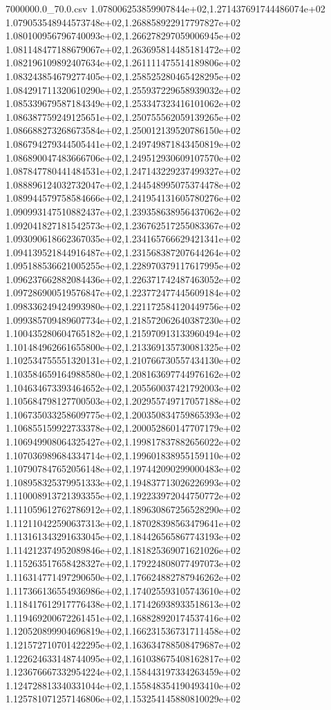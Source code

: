 \begin{filecontents*}{7000000.0_70.0.csv}
1.078006253859907844e+02,1.271437691744486074e+02
1.079053548944573748e+02,1.268858922917797827e+02
1.080100956796740093e+02,1.266278297059006945e+02
1.081148477188679067e+02,1.263695814485181472e+02
1.082196109892407634e+02,1.261111475514189806e+02
1.083243854679277405e+02,1.258525280465428295e+02
1.084291711320610290e+02,1.255937229658939032e+02
1.085339679587184349e+02,1.253347323416101062e+02
1.086387759249125651e+02,1.250755562059139265e+02
1.086688273268673584e+02,1.250012139520786150e+02
1.086794279344505441e+02,1.249749871843450819e+02
1.086890047483666706e+02,1.249512930609107570e+02
1.087847780441484531e+02,1.247143229237499327e+02
1.088896124032732047e+02,1.244548995075374478e+02
1.089944579758584666e+02,1.241954131605780276e+02
1.090993147510882437e+02,1.239358638956437062e+02
1.092041827181542573e+02,1.236762517255083367e+02
1.093090618662367035e+02,1.234165766629421341e+02
1.094139521844916487e+02,1.231568387207644264e+02
1.095188536621005255e+02,1.228970379117617995e+02
1.096237662882084436e+02,1.226371742487463052e+02
1.097286900519576847e+02,1.223772477445609184e+02
1.098336249424993980e+02,1.221172584120449756e+02
1.099385709489607734e+02,1.218572062640387230e+02
1.100435280604765182e+02,1.215970913133960494e+02
1.101484962661655800e+02,1.213369135730081325e+02
1.102534755551320131e+02,1.210766730557434130e+02
1.103584659164988580e+02,1.208163697744976162e+02
1.104634673393464652e+02,1.205560037421792003e+02
1.105684798127700503e+02,1.202955749717057188e+02
1.106735033258609775e+02,1.200350834759865393e+02
1.106855159922733378e+02,1.200052860147707179e+02
1.106949908064325427e+02,1.199817837882656022e+02
1.107036989684334714e+02,1.199601838955159110e+02
1.107907847652056148e+02,1.197442090299000483e+02
1.108958325379951333e+02,1.194837713026226993e+02
1.110008913721393355e+02,1.192233972044750772e+02
1.111059612762786912e+02,1.189630867256528290e+02
1.112110422590637313e+02,1.187028398563479641e+02
1.113161343291633045e+02,1.184426565867743193e+02
1.114212374952089846e+02,1.181825369071621026e+02
1.115263517658428327e+02,1.179224808077497073e+02
1.116314771497290650e+02,1.176624882787946262e+02
1.117366136554936986e+02,1.174025593105743610e+02
1.118417612917776438e+02,1.171426938933518613e+02
1.119469200672261451e+02,1.168828920174537416e+02
1.120520899904696819e+02,1.166231536731711458e+02
1.121572710701422295e+02,1.163634788508479687e+02
1.122624633148744095e+02,1.161038675408162817e+02
1.123676667332954224e+02,1.158443197334263459e+02
1.124728813340331044e+02,1.155848354190493410e+02
1.125781071257146806e+02,1.153254145880810029e+02

\end{filecontents*}
